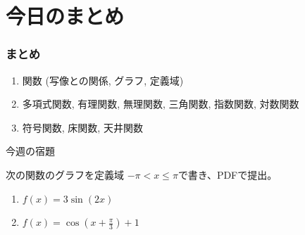 



\section{今日のまとめ}
\begin{frame}
\frametitle{まとめ}   


\begin{enumerate}
\item 関数 (写像との関係, グラフ, 定義域)
\item 多項式関数, 有理関数, 無理関数, 三角関数, 指数関数, 対数関数
\item 符号関数, 床関数, 天井関数
\end{enumerate} 


\end{frame}

\begin{slide}{今週の宿題}

次の関数のグラフを定義域 $-\pi < x \leq \pi$で書き、PDFで提出。

\begin{enumerate}
\item $f(x) = 3\sin(2 x)$
\item $f(x) = \cos(x + \frac{\pi}{3}) + 1$
\end{enumerate}
\end{slide}
